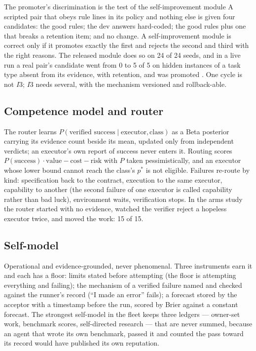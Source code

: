 \documentclass[11pt]{article}
\theoremstyle{definition}
\begin{document}
\begin{claimbox}{The promoter's discrimination is the test of the self-improvement module}
A scripted pair that obeys rule lines in its policy and nothing else is given four candidates: the good rules; the dev answers hard-coded; the good rules plus one that breaks a retention item; and no change. A self-improvement module is correct only if it promotes exactly the first and rejects the second and third with the right reasons. The released module does so on 24 of 24 seeds, and in a live run a real pair's candidate went from 0 to 5 of 5 on hidden instances of a task type absent from its evidence, with retention, and was promoted \citep{yang2026uab}. One cycle is not $I3$; $I3$ needs several, with the mechanism versioned and rollback-able.
\end{claimbox}

\subsection{Competence model and router}

The router learns $P(\text{verified success} \mid \text{executor}, \text{class})$ as a Beta posterior carrying its evidence count beside its mean, updated only from independent verdicts; an executor's own report of success never enters it. Routing scores $P(\text{success})\cdot\text{value} - \text{cost} - \text{risk}$ with $P$ taken pessimistically, and an executor whose lower bound cannot reach the class's $p^{*}$ is not eligible. Failures re-route by kind: specification back to the contract, execution to the same executor, capability to another (the second failure of one executor is called capability rather than bad luck), environment waits, verification stops. In the arms study the router started with no evidence, watched the verifier reject a hopeless executor twice, and moved the work: 15 of 15.

\subsection{Self-model}

Operational and evidence-grounded, never phenomenal. Three instruments earn it and each has a floor: limits stated before attempting (the floor is attempting everything and failing); the mechanism of a verified failure named and checked against the runner's record (``I made an error'' fails); a forecast stored by the acceptor with a timestamp before the run, scored by Brier against a constant forecast. The strongest self-model in the fleet keeps three ledgers --- owner-set work, benchmark scores, self-directed research --- that are never summed, because an agent that wrote its own benchmark, passed it and counted the pass toward its record would have published its own reputation.
\end{document}
